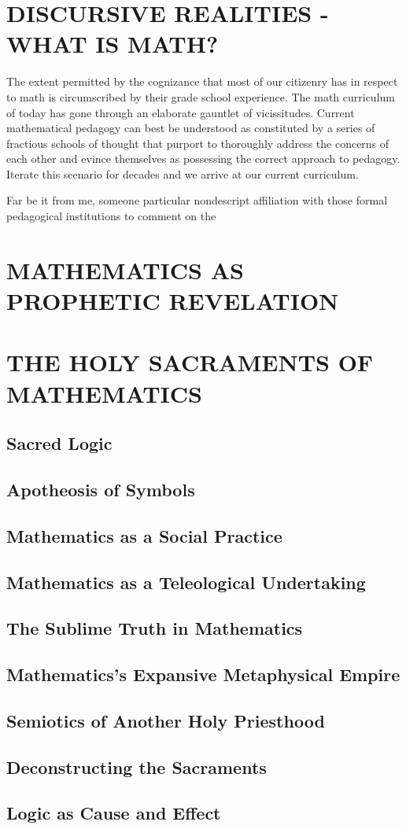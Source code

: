 \documentclass[ms,a4paper]{memoir}
\newcommand{\red}[1]{\textcolor{red!50!black}{#1}}
\newcommand{\RED}[1]{\textcolor{red!50!black}{\MakeUppercase{#1}}}
\begin{document}
	
	\chapter{\RED{Discursive Realities - What is Math?}}
	The extent permitted by the cognizance that most of our citizenry has in respect to math is circumscribed by their grade school experience. The math curriculum of today has gone through an elaborate gauntlet of vicissitudes. Current mathematical pedagogy can best be understood as constituted by a series of fractious schools of thought that purport to thoroughly address the concerns of each other and evince themselves as possessing the correct approach to pedagogy. Iterate this scenario for decades and we arrive at our current curriculum.
	
	Far be it from me, someone particular nondescript affiliation with those formal pedagogical institutions to comment on the 
	
	
	\chapter{\RED{Mathematics as Prophetic Revelation}}
	
	\chapter{\RED{The Holy Sacraments of Mathematics}}
	\section{\red{Sacred Logic}}
	\section{\red{Apotheosis of Symbols}}
	\section{\red{Mathematics as a Social Practice}}
	\section{\red{Mathematics as a Teleological Undertaking}}
	\section{\red{The Sublime Truth in Mathematics}}
	\section{\red{Mathematics's Expansive Metaphysical Empire}}
	\section{\red{Semiotics of Another Holy Priesthood}}
	\section{\red{Deconstructing the Sacraments}}
	\section{\red{Logic as Cause and Effect}}
\end{document}
